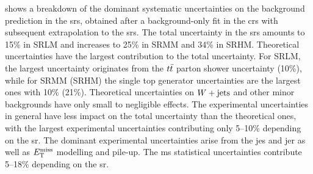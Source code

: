  shows a breakdown of the dominant systematic uncertainties on the background prediction in the \glspl{sr}, obtained after a background-only fit in the \glspl{cr} with subsequent extrapolation to the \glspl{sr}. The total uncertainty in the \glspl{sr} amounts to 15\% in SRLM and increases to 25\% in SRMM and 34\% in SRHM. Theoretical uncertainties have the largest contribution to the total uncertainty. For SRLM, the largest uncertainty originates from the $t\bar{t}$ parton shower uncertainty (10\%), while for SRMM (SRHM) the single top generator uncertainties are the largest ones with 10\% (21\%). Theoretical uncertainties on $W+\mathrm{jets}$ and other minor backgrounds have only small to negligible effects. The experimental uncertainties in general have less impact on the total uncertainty than the theoretical ones, with the largest experimental uncertainties contributing only 5--10\% depending on the \gls{sr}. The dominant experimental uncertainties arise from the \gls{jes} and \gls{jer} as well as $E_{\textrm{T}}^{\textrm{miss}}$ modelling and pile-up. The \gls{ms} statistical uncertainties contribute 5--18\% depending on the \gls{sr}.  

